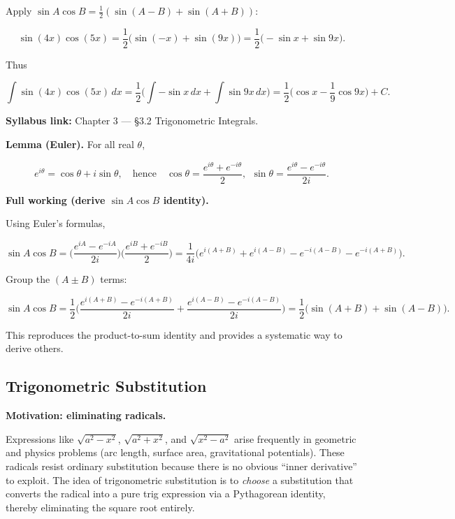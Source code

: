 \begin{examplebox}[title={Worked Example: $\displaystyle \int \sin(4x)\cos(5x)\,dx$}]

Apply $\sin A\cos B=\frac12(\sin(A-B)+\sin(A+B))$:

\[
\sin(4x)\cos(5x)=\frac12\big(\sin(-x)+\sin(9x)\big)
=\frac12\big(-\sin x+\sin 9x\big).
\]

Thus

\[
\int \sin(4x)\cos(5x)\,dx
=\frac12\Big(\int -\sin x\,dx+\int \sin 9x\,dx\Big)
=\frac12\Big(\cos x-\frac{1}{9}\cos 9x\Big)+C.
\]

\end{examplebox}

\begin{extension}[title={Extension (Beyond Syllabus: Complex-exponential shortcut for product-to-sum)}]

\textbf{Syllabus link:} Chapter 3 — \S3.2 Trigonometric Integrals.

\textbf{Lemma (Euler).} For all real $\theta$,

\[
e^{i\theta}=\cos\theta+i\sin\theta,
\quad\text{hence}\quad
\cos\theta=\frac{e^{i\theta}+e^{-i\theta}}{2},\ \
\sin\theta=\frac{e^{i\theta}-e^{-i\theta}}{2i}.
\]

\textbf{Full working (derive $\sin A\cos B$ identity).}

Using Euler's formulas,

\[
\sin A\cos B
=\Big(\frac{e^{iA}-e^{-iA}}{2i}\Big)\Big(\frac{e^{iB}+e^{-iB}}{2}\Big)
=\frac{1}{4i}\Big(e^{i(A+B)}+e^{i(A-B)}-e^{-i(A-B)}-e^{-i(A+B)}\Big).
\]

Group the $(A\pm B)$ terms:

\[
\sin A\cos B
=\frac{1}{2}\Big(\frac{e^{i(A+B)}-e^{-i(A+B)}}{2i}+\frac{e^{i(A-B)}-e^{-i(A-B)}}{2i}\Big)
=\frac12\big(\sin(A+B)+\sin(A-B)\big).
\]

This reproduces the product-to-sum identity and provides a systematic way to derive others.

\end{extension}

\subsection{Trigonometric Substitution}

\textbf{Motivation: eliminating radicals.}

Expressions like $\sqrt{a^2-x^2}$, $\sqrt{a^2+x^2}$, and $\sqrt{x^2-a^2}$ arise frequently in geometric and physics problems (arc length, surface area, gravitational potentials). These radicals resist ordinary substitution because there is no obvious ``inner derivative'' to exploit. The idea of trigonometric substitution is to \emph{choose} a substitution that converts the radical into a pure trig expression via a Pythagorean identity, thereby eliminating the square root entirely.

